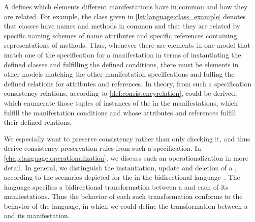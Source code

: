 A \commonality defines which elements different manifestations have in common and how they are related.
For example, the class \commonality given in \autoref{lst:language:class_example} denotes that classes have names and methods in common and that they are related by specific naming schemes of name attributes and specific references containing representations of methods.
Thus, whenever there are elements in one model that match one of the specification for a manifestation in terms of instantiating the defined classes and fulfilling the defined conditions, there must be elements in other models matching the other manifestation specifications and fulling the defined relations for attributes and references.
In theory, from such a specification consistency relations, according to \autoref{def:consistencyrelation}, could be derived, which enumerate those tuples of instances of the \metaclasses in the manifestations, which fulfill the manifestation conditions and whose attributes and references fulfill their defined relations.

We especially want to preserve consistency rather than only checking it, and thus derive consistency preservation rules from such a specification.
In \autoref{chap:language:operationalization}, we discuss such an operationalization in more detail.
In general, we distinguish the instantiation, update and deletion of a \commonality, according to the scenarios depicted for \mappings the in the bidirectional \mappings language~\cite[Sec. 7.2.1]{klare2020Vitruv-JSS}.
The \commonalities language specifies a bidirectional transformation between a \commonality and each of its manifestations.
Thus the behavior of each such transformation conforms to the behavior of the \mappings language, in which we could define the transformation between a \commonality and its manifestation.

